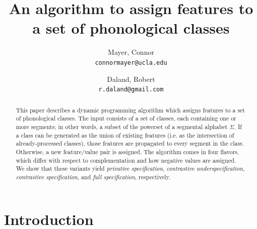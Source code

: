\documentclass[11pt, oneside]{article}   	%
\title{An algorithm to assign features to a set of phonological classes}
\author{}
\author{
  Mayer, Connor \\
  \texttt{connormayer@ucla.edu}
  \and
  Daland, Robert \\
  \texttt{r.daland@gmail.com}
}
\date{\vspace{-5ex}}							%
\begin{document}
\maketitle

\begin{abstract}
This paper describes a dynamic programming algorithm which assigns features to a set of phonological classes. The input consists of a set of classes, each containing one or more segments; in other words, a subset of the powerset of a segmental alphabet $\Sigma$. If a class can be generated as the union of existing features (i.e. as the intersection of already-processed classes), those features are propagated to every segment in the class. Otherwise, a new feature/value pair is assigned. The algorithm comes in four flavors, which differ with respect to complementation and how negative values are assigned. We show that these variants yield \textit{privative specification}, \textit{contrastive underspecification}, \textit{contrastive specification}, and \textit{full specification}, respectively. 
\end{abstract}

\section{Introduction}
\end{document}
